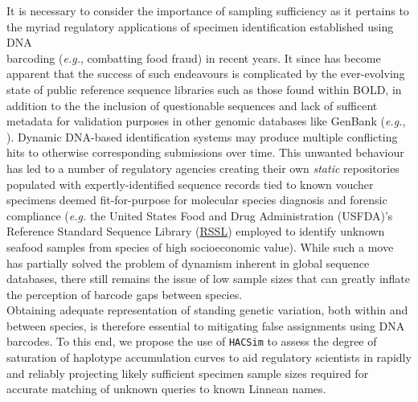 It is necessary to consider the importance of sampling sufficiency as it pertains to \\ the myriad regulatory applications of specimen identification  established using DNA \\ barcoding (\textit{e.g.}, combatting food fraud) in recent years. It since has become apparent that the success of such endeavours is complicated by the ever-evolving state of public reference sequence libraries such as those found within BOLD, in addition to the the inclusion of questionable sequences and lack of sufficent metadata for validation purposes in other genomic databases like GenBank (\textit{e.g.}, \cite{harris2003can}). Dynamic DNA-based identification systems may produce multiple conflicting hits to otherwise corresponding submissions over time. This unwanted behaviour has led to a number of regulatory agencies creating their own \textit{static} repositories populated with expertly-identified sequence records tied to known voucher specimens deemed fit-for-purpose for molecular species diagnosis and forensic compliance (\textit{e.g.} the United States Food and Drug Administration (USFDA)'s Reference Standard Sequence Library (\href{https://www.accessdata.fda.gov/scripts/fdcc/?set=seafood_barcode_data}{RSSL}) employed to identify unknown seafood samples from species of high socioeconomic value). While such a move has partially solved the problem of dynamism inherent in global sequence databases, there still remains the issue of low sample sizes that can greatly inflate the perception of barcode gaps between species. \\ Obtaining adequate representation of standing genetic variation, both within and between species, is therefore essential to mitigating false assignments using DNA barcodes. To this end, we propose the use of {\tt HACSim} to assess the degree of saturation of haplotype accumulation curves to aid regulatory scientists in rapidly and reliably projecting likely sufficient specimen sample sizes required for accurate matching of unknown queries to known Linnean names. 

